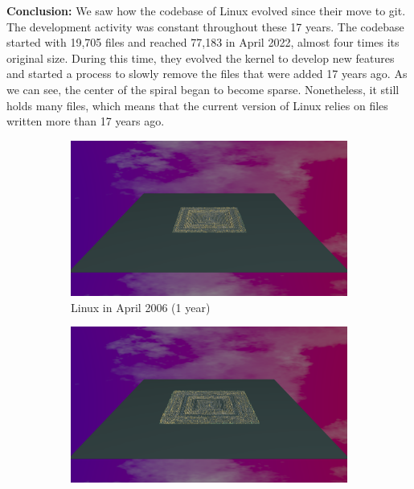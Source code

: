\textbf{Conclusion:}
 We saw how the codebase of Linux evolved since their move to git. The development activity was constant throughout these 17 years. The codebase started with 19,705 files and reached 77,183 in April 2022, almost four times its original size. During this time, they evolved the kernel to develop new features and started a process to slowly remove the files that were added 17 years ago. As we can see, the center of the spiral began to become sparse. Nonetheless, it still holds many files, which means that the current version of Linux relies on files written more than 17 years ago. 

\bigbreak



\begin{figure}[ht]
    \begin{subfigure}{0.48\textwidth}
        \includegraphics[width=\linewidth]{Linux/Animation001.png}
        \caption{Linux in April 2006 (1 year)} 
        \label{fig:Linux_V7_S1}
    \end{subfigure}\hspace*{\fill}
    \begin{subfigure}{0.48\textwidth}
        \includegraphics[width=\linewidth]{Linux/Animation004.png}

\end{subfigure}
\end{figure}
